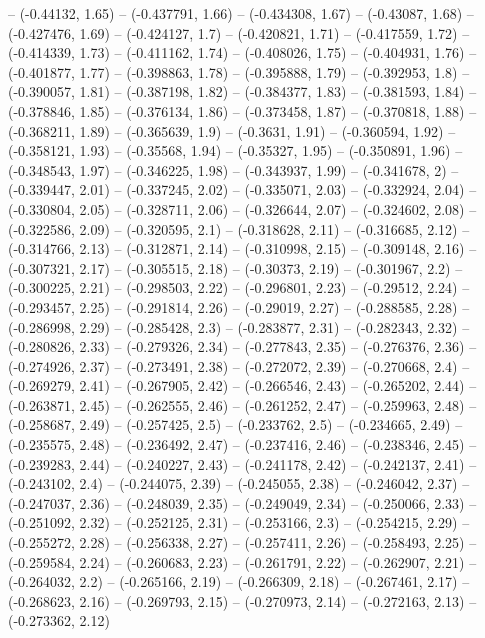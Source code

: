 -- (-0.44132, 1.65)
-- (-0.437791, 1.66)
-- (-0.434308, 1.67)
-- (-0.43087, 1.68)
-- (-0.427476, 1.69)
-- (-0.424127, 1.7)
-- (-0.420821, 1.71)
-- (-0.417559, 1.72)
-- (-0.414339, 1.73)
-- (-0.411162, 1.74)
-- (-0.408026, 1.75)
-- (-0.404931, 1.76)
-- (-0.401877, 1.77)
-- (-0.398863, 1.78)
-- (-0.395888, 1.79)
-- (-0.392953, 1.8)
-- (-0.390057, 1.81)
-- (-0.387198, 1.82)
-- (-0.384377, 1.83)
-- (-0.381593, 1.84)
-- (-0.378846, 1.85)
-- (-0.376134, 1.86)
-- (-0.373458, 1.87)
-- (-0.370818, 1.88)
-- (-0.368211, 1.89)
-- (-0.365639, 1.9)
-- (-0.3631, 1.91)
-- (-0.360594, 1.92)
-- (-0.358121, 1.93)
-- (-0.35568, 1.94)
-- (-0.35327, 1.95)
-- (-0.350891, 1.96)
-- (-0.348543, 1.97)
-- (-0.346225, 1.98)
-- (-0.343937, 1.99)
-- (-0.341678, 2)
-- (-0.339447, 2.01)
-- (-0.337245, 2.02)
-- (-0.335071, 2.03)
-- (-0.332924, 2.04)
-- (-0.330804, 2.05)
-- (-0.328711, 2.06)
-- (-0.326644, 2.07)
-- (-0.324602, 2.08)
-- (-0.322586, 2.09)
-- (-0.320595, 2.1)
-- (-0.318628, 2.11)
-- (-0.316685, 2.12)
-- (-0.314766, 2.13)
-- (-0.312871, 2.14)
-- (-0.310998, 2.15)
-- (-0.309148, 2.16)
-- (-0.307321, 2.17)
-- (-0.305515, 2.18)
-- (-0.30373, 2.19)
-- (-0.301967, 2.2)
-- (-0.300225, 2.21)
-- (-0.298503, 2.22)
-- (-0.296801, 2.23)
-- (-0.29512, 2.24)
-- (-0.293457, 2.25)
-- (-0.291814, 2.26)
-- (-0.29019, 2.27)
-- (-0.288585, 2.28)
-- (-0.286998, 2.29)
-- (-0.285428, 2.3)
-- (-0.283877, 2.31)
-- (-0.282343, 2.32)
-- (-0.280826, 2.33)
-- (-0.279326, 2.34)
-- (-0.277843, 2.35)
-- (-0.276376, 2.36)
-- (-0.274926, 2.37)
-- (-0.273491, 2.38)
-- (-0.272072, 2.39)
-- (-0.270668, 2.4)
-- (-0.269279, 2.41)
-- (-0.267905, 2.42)
-- (-0.266546, 2.43)
-- (-0.265202, 2.44)
-- (-0.263871, 2.45)
-- (-0.262555, 2.46)
-- (-0.261252, 2.47)
-- (-0.259963, 2.48)
-- (-0.258687, 2.49)
-- (-0.257425, 2.5)
-- (-0.233762, 2.5)
-- (-0.234665, 2.49)
-- (-0.235575, 2.48)
-- (-0.236492, 2.47)
-- (-0.237416, 2.46)
-- (-0.238346, 2.45)
-- (-0.239283, 2.44)
-- (-0.240227, 2.43)
-- (-0.241178, 2.42)
-- (-0.242137, 2.41)
-- (-0.243102, 2.4)
-- (-0.244075, 2.39)
-- (-0.245055, 2.38)
-- (-0.246042, 2.37)
-- (-0.247037, 2.36)
-- (-0.248039, 2.35)
-- (-0.249049, 2.34)
-- (-0.250066, 2.33)
-- (-0.251092, 2.32)
-- (-0.252125, 2.31)
-- (-0.253166, 2.3)
-- (-0.254215, 2.29)
-- (-0.255272, 2.28)
-- (-0.256338, 2.27)
-- (-0.257411, 2.26)
-- (-0.258493, 2.25)
-- (-0.259584, 2.24)
-- (-0.260683, 2.23)
-- (-0.261791, 2.22)
-- (-0.262907, 2.21)
-- (-0.264032, 2.2)
-- (-0.265166, 2.19)
-- (-0.266309, 2.18)
-- (-0.267461, 2.17)
-- (-0.268623, 2.16)
-- (-0.269793, 2.15)
-- (-0.270973, 2.14)
-- (-0.272163, 2.13)
-- (-0.273362, 2.12)
